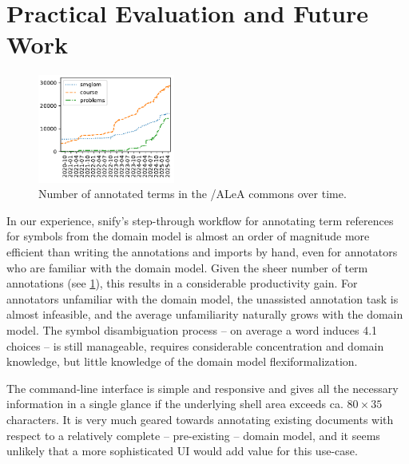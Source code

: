 \documentclass[runningheads]{llncs}
\newcommand\ALeA{\textsf{ALeA}\xspace}
\newcommand\snify{\textsf{snify}\xspace}
\begin{document}
\section{Practical Evaluation and Future Work}\label{sec:eval}
\begin{figure}
  \centering
  \includegraphics[width=0.4\textwidth]{../img/annocounts.pdf}
  \caption{Number of annotated terms in the \sTeX/\ALeA commons over time.}\label{fig:annocounts}
\end{figure}
In our experience, \snify's step-through workflow for annotating term references for symbols
from the domain model is almost an order of magnitude more efficient than writing the
annotations and imports by hand, even for annotators who are familiar with the domain
model.
Given the sheer number of term annotations (see \cref{fig:annocounts}),
this results in a considerable productivity gain.
For annotators unfamiliar with the domain model, the unassisted annotation task is
almost infeasible, and the average unfamiliarity naturally grows with the domain
model. The symbol disambiguation process -- on average a word induces 4.1 choices
-- is still manageable,
requires considerable concentration and domain knowledge, but little knowledge of the
domain model flexiformalization.

The command-line interface is simple and responsive and gives all the necessary
information in a single glance if the underlying shell area exceeds ca. $80\times 35$
characters. It is very much geared towards annotating existing documents with respect to a
relatively complete -- pre-existing -- domain model, and it seems unlikely that a more
sophisticated UI would add value for this use-case.
\end{document}
